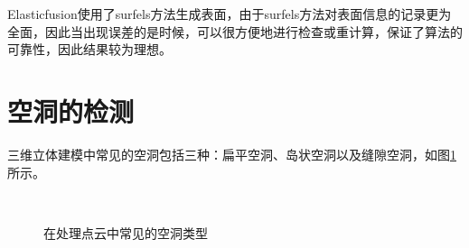 \documentclass{llncs}
\begin{document}
\begin{CJK}{UTF8}{song}
Elasticfusion使用了surfels方法\cite{DBLP:conf/siggraph/PfisterZBG00}生成表面，由于surfels方法对表面信息的记录更为全面，因此当出现误差的是时候，可以很方便地进行检查或重计算，保证了算法的可靠性，因此结果较为理想。

\section{空洞的检测}

三维立体建模中常见的空洞包括三种：扁平空洞、岛状空洞以及缝隙空洞\cite{DBLP:journals/vc/GuoXW18}，如图\ref{holeType}所示。

\begin{figure}[htbp]
\centering
{} \\
\caption{在处理点云中常见的空洞类型}
\label{holeType}
\end{figure}


\end{CJK}
\end{document}
